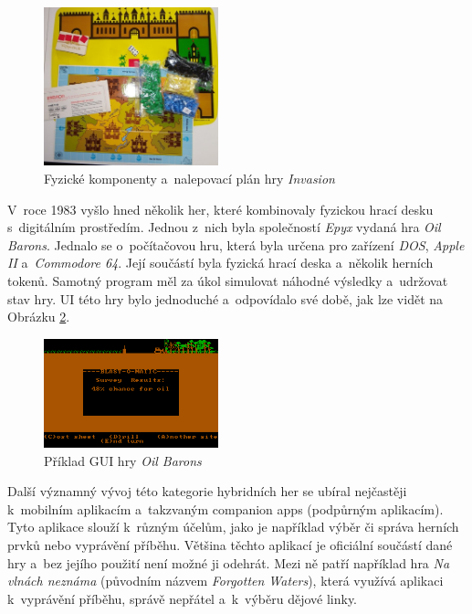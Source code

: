 \begin{figure}[H]
    \centering
    \includegraphics[width=0.45\textwidth]{resources/figures/invasion.jpg}
    \caption{Fyzické komponenty a~nalepovací plán hry \textit{Invasion} \cite{invasion}}
    \label{fig:invasion}
\end{figure}

V~roce 1983 vyšlo hned několik her, které kombinovaly fyzickou hrací desku s~digitálním prostředím. Jednou z~nich byla společností \textit{Epyx} vydaná hra \textit{Oil Barons}. Jednalo se o~počítačovou hru, která byla určena pro zařízení \textit{DOS}, \textit{Apple II} a~\textit{Commodore 64}. Její součástí byla fyzická hrací deska a~několik herních tokenů. Samotný program měl za úkol simulovat náhodné výsledky a~udržovat stav hry. UI této hry bylo jednoduché a~odpovídalo své době, jak lze vidět na Obrázku \ref{fig:oil_barons}. \cite{oil_barons}

\begin{figure}[H]
    \centering
    \includegraphics[width=0.45\textwidth]{resources/figures/oil_barons.png}
    \caption{Příklad GUI hry \textit{Oil Barons} \cite{oil_barons}}
    \label{fig:oil_barons}
\end{figure}

Další významný vývoj této kategorie hybridních her se ubíral nejčastěji k~mobilním aplikacím a~takzvaným companion apps (podpůrným aplikacím). Tyto aplikace slouží k~různým účelům, jako je například výběr či správa herních prvků nebo vyprávění příběhu. Většina těchto aplikací je oficiální součástí dané hry a~bez jejího použití není možné ji odehrát. Mezi ně patří například hra \textit{Na vlnách neznáma} (původním názvem \textit{Forgotten Waters}), která využívá aplikaci k~vyprávění příběhu, správě nepřátel a~k~výběru dějové linky.

